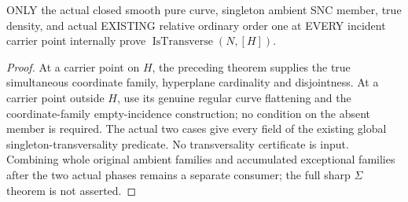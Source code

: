 \begin{theorem}
\label{hir:sharp-actual-curve-singleton-transverse-of-order-one}
\leanok
ONLY the actual closed smooth pure curve, singleton ambient SNC member,
true density, and actual EXISTING relative ordinary order one at EVERY
incident carrier point internally prove $\operatorname{IsTransverse}(N,[H])$.
\end{theorem}
\begin{proof}
At a carrier point on $H$, the preceding theorem supplies the true
simultaneous coordinate family, hyperplane cardinality and disjointness.
At a carrier point outside $H$, use its genuine regular curve flattening
and the coordinate-family empty-incidence construction; no condition on
the absent member is required. The actual two cases give every field of
the existing global singleton-transversality predicate. No transversality
certificate is input. Combining whole original ambient families and
accumulated exceptional families after the two actual phases remains
a separate consumer; the full sharp $\Sigma$ theorem is not asserted.
\end{proof}
